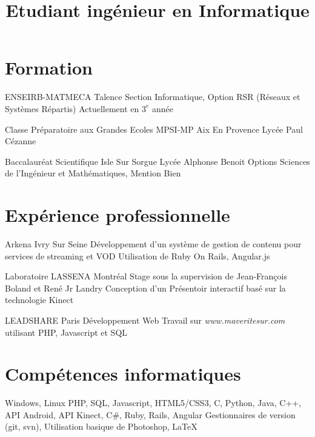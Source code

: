 \documentclass{cvdebatard}
\begin{document}
\title{Etudiant ingénieur en Informatique}
\address{Talence, France}

\makecvheader

\section{Formation}
\begin{cventrylist}
            {ENSEIRB-MATMECA}
            {Talence}
            {\newline Section Informatique, Option RSR (Réseaux et Systèmes Répartis)}
            {Actuellement en $3^{e}$ année}

            {Classe Préparatoire aux Grandes Ecoles MPSI-MP}
            {Aix En Provence}
            {\newline Lycée Paul Cézanne}
            {}

            {Baccalauréat Scientifique}
            {Isle Sur Sorgue}
            {\newline Lycée Alphonse Benoit}
            {Options Sciences de l'Ingénieur et Mathématiques, Mention Bien}
\end{cventrylist}

\section{Expérience professionnelle}
\begin{cventrylist}
            {Arkena}
            {Ivry Sur Seine}
            {Développement d'un système de gestion de contenu pour services de streaming et VOD}
            {Utilisation de Ruby On Rails, Angular.js}

            {Laboratoire LASSENA}
            {Montréal}
            {Stage sous la supervision de Jean-François Boland et René Jr Landry}
            {Conception d'un Présentoir interactif basé sur la technologie Kinect}

            {LEADSHARE}
            {Paris}
            {Développement Web}
            {Travail sur \emph{www.maveritesur.com} utilisant PHP, Javascript et SQL}
\end{cventrylist}

\section{Compétences informatiques}
\begin{cventrylist}
            {Windows, Linux}
            {}{}{}
            {PHP, SQL, Javascript, HTML5/CSS3, C, Python, Java, \newline C++, API Android, API Kinect, C\#, Ruby, Rails, Angular}
            {}{}{}
            {\textnormal{Gestionnaires de version (git, svn), Utilisation basique de Photoshop, \LaTeX}}
            {}{}{}
\end{cventrylist}
\end{document}
